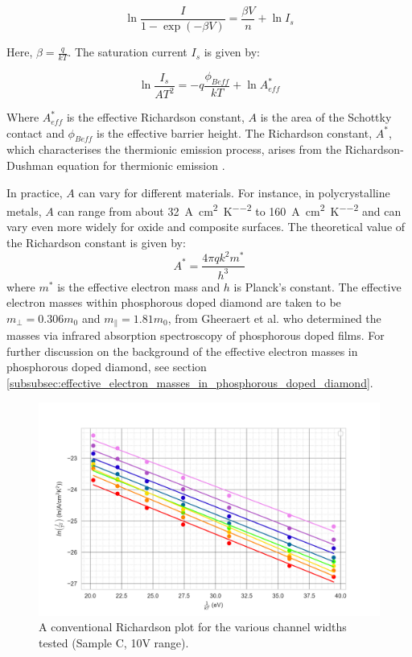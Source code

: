 \begin{refsection}
\begin{equation}
    \ln{\frac{I}{1-\exp{\left(-\beta V\right)}}} = \frac{\beta V}{n} + \ln{I_{s}}
    \label{eq:thermionic_emission_graphical}
\end{equation}

Here, \(\beta=\frac{q}{kT}\). The saturation current $I_{s}$ is given by:

\begin{equation}
\label{eq:richarson-linear}
    \ln{\frac{I_{s}}{AT^{2}}} = -q\frac{\phi_{Beff}}{kT} + \ln{A^{*}_{eff}}
\end{equation}

Where $A^{*}_{eff}$ is the effective Richardson constant, $A$ is the area of the Schottky contact and $\phi_{Beff}$ is the effective barrier height. The Richardson constant, \( A^{*} \), which characterises the thermionic emission process, arises from the Richardson-Dushman equation for thermionic emission \cite{sze2006}.

In practice, \( A \) can vary for different materials. For instance, in polycrystalline metals, \( A \) can range from about \SI{32}{\ampere\per\centi\meter\squared\per\kelvin\squared} to \SI{160}{\ampere\per\centi\meter\squared\per\kelvin\squared} and can vary even more widely for oxide and composite surfaces. The theoretical value of the Richardson constant is given by:
\begin{equation}
    A^{*} = \frac{4\pi qk^{2}m^{*}}{h^{3}}
\end{equation}
where \(m^{*}\) is the effective electron mass and \(h\) is Planck's constant. The effective electron masses within phosphorous doped diamond are taken to be $m_{\perp}=0.306m_{0}$ and $m_{\parallel}=1.81m_{0}$, from Gheeraert et al. \cite{Gheeraert2001} who determined the masses via infrared absorption spectroscopy of phosphorous doped films. For further discussion on the background of the effective electron masses in phosphorous doped diamond, see section \ref{subsubsec:effective_electron_masses_in_phosphorous_doped_diamond}.

\begin{figure}[h]
    \centering
    \includegraphics[width=\textwidth]{Chapter3/Figs/Raster/Sample C 2019/newRichardson_Plot_10V.png}
    \caption{A conventional Richardson plot for the various channel widths tested (Sample C, 10V range).}
    \label{fig:richardsonC}
\end{figure}


\end{refsection}
